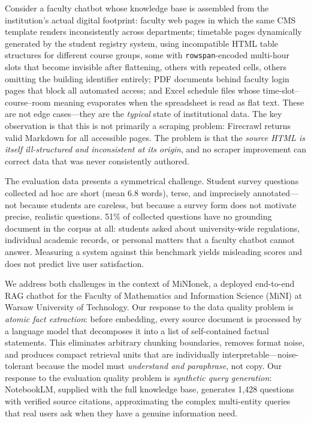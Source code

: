 \documentclass[sigconf,natbib=true]{acmart}
\begin{document}
Consider a faculty chatbot whose knowledge base is assembled from the institution's actual digital footprint: faculty web pages in which the same CMS template renders inconsistently across departments; timetable pages dynamically generated by the student registry system, using incompatible HTML table structures for different course groups, some with \texttt{rowspan}-encoded multi-hour slots that become invisible after flattening, others with repeated cells, others omitting the building identifier entirely; PDF documents behind faculty login pages that block all automated access; and Excel schedule files whose time-slot--course--room meaning evaporates when the spreadsheet is read as flat text.
These are not edge cases---they are the \emph{typical} state of institutional data.
The key observation is that this is not primarily a scraping problem: Firecrawl returns valid Markdown for all accessible pages.
The problem is that the \emph{source HTML is itself ill-structured and inconsistent at its origin}, and no scraper improvement can correct data that was never consistently authored.

The evaluation data presents a symmetrical challenge.
Student survey questions collected ad hoc are short (mean 6.8 words), terse, and imprecisely annotated---not because students are careless, but because a survey form does not motivate precise, realistic questions.
51\% of collected questions have no grounding document in the corpus at all: students asked about university-wide regulations, individual academic records, or personal matters that a faculty chatbot cannot answer.
Measuring a system against this benchmark yields misleading scores and does not predict live user satisfaction.

We address both challenges in the context of MiNIonek, a deployed end-to-end RAG chatbot for the Faculty of Mathematics and Information Science (MiNI) at Warsaw University of Technology.
Our response to the data quality problem is \emph{atomic fact extraction}: before embedding, every source document is processed by a language model that decomposes it into a list of self-contained factual statements.
This eliminates arbitrary chunking boundaries, removes format noise, and produces compact retrieval units that are individually interpretable---noise-tolerant because the model must \emph{understand and paraphrase}, not copy.
Our response to the evaluation quality problem is \emph{synthetic query generation}: NotebookLM, supplied with the full knowledge base, generates 1{,}428 questions with verified source citations, approximating the complex multi-entity queries that real users ask when they have a genuine information need.
\end{document}
